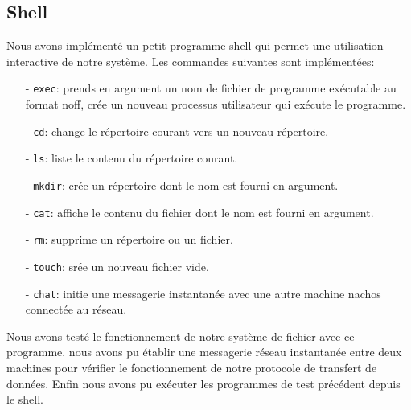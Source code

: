\documentclass[11pt]{article}
\theoremstyle{definition}
\theoremstyle{definition}
\begin{document}
\subsection{Shell}
Nous avons implémenté un petit programme shell qui permet une utilisation interactive de notre système. Les commandes suivantes sont implémentées:
\begin{itemize}
\item[-] \texttt{exec}: prends en argument un nom de fichier de programme exécutable au format noff, crée un nouveau processus utilisateur qui exécute le programme.
\item[-] \texttt{cd}: change le répertoire courant vers un nouveau répertoire.
\item[-] \texttt{ls}: liste le contenu du répertoire courant.
\item[-] \texttt{mkdir}: crée un répertoire dont le nom est fourni en argument.
\item[-] \texttt{cat}: affiche le contenu du fichier dont le nom est fourni en argument.
\item[-] \texttt{rm}: supprime un répertoire ou un fichier.
\item[-] \texttt{touch}: srée un nouveau fichier vide.
\item[-] \texttt{chat}: initie une messagerie instantanée avec une autre machine
  nachos connectée au réseau.
\end{itemize}
Nous avons testé le fonctionnement de notre système de fichier avec ce programme.
nous avons pu établir une messagerie réseau instantanée entre deux machines pour vérifier le fonctionnement de notre protocole de transfert de données.
Enfin nous avons pu exécuter les programmes de test précédent depuis le shell.
\end{document}
